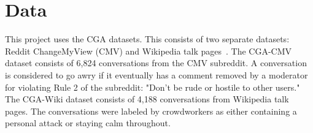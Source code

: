 \section{Data}

This project uses the CGA datasets.
This consists of two separate datasets: Reddit ChangeMyView (CMV) and Wikipedia talk pages~\citep{chang-danescu-niculescu-mizil-2019-trouble,zhang-etal-2018-conversations}.
The CGA-CMV dataset consists of 6,824 conversations from the CMV subreddit.
A conversation is considered to go awry if it eventually has a comment removed by a moderator for violating Rule 2 of the subreddit: "Don't be rude or hostile to other users."
The CGA-Wiki dataset consists of 4,188 conversations from Wikipedia talk pages.
The conversations were labeled by crowdworkers as either containing a personal attack or staying calm throughout.
